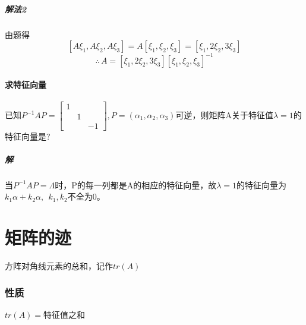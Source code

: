 \subparagraph{解法2}
由题得\[[A\xi_1, A\xi_2, A\xi_3] = A[\xi_1, \xi_2, \xi_3] = [\xi_1, 2\xi_2, 3\xi_3]\]
\[\therefore\, A = [\xi_1, 2\xi_2, 3\xi_3][\xi_1, \xi_2, \xi_3]^{-1}\]

\paragraph{求特征向量}
已知\(P^{-1}AP = \begin{bmatrix}
    1 \\ 
     & 1 \\ 
     & & -1
\end{bmatrix}, P = (\alpha_1, \alpha_2, \alpha_3)\)可逆，则矩阵A关于特征值\(\lambda = 1\)的特征向量是?
\subparagraph{解}
当\(P^{-1}AP = \Lambda\)时，P的每一列都是A的相应的特征向量，故\(\lambda = 1\)的特征向量为\(k_1\alpha + k_2\alpha,\ \ k_1, k_2\)不全为0。




\section{矩阵的迹}
方阵对角线元素的总和，记作\(tr(A)\)

\subsubsection{性质}

\(tr(A) = \)特征值之和








